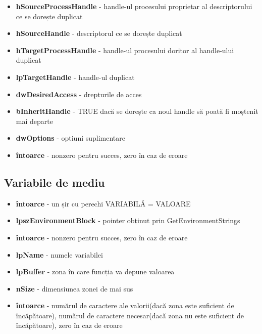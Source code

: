 \documentclass{refcard.cs.pub.ro}
\begin{document}
\begin{multicols*}{3}
\begin{itemize}
\item \textbf{hSourceProcessHandle} - handle-ul procesului proprietar al descriptorului ce se dorește duplicat
\item \textbf{hSourceHandle} - descriptorul ce se dorește duplicat
\item \textbf{hTargetProcessHandle} - handle-ul procesului doritor al handle-ului duplicat
\item \textbf{lpTargetHandle} - handle-ul duplicat
\item \textbf{dwDesiredAccess} - drepturile de acces
\item \textbf{bInheritHandle} - TRUE dacă se dorește ca noul handle să poată fi moștenit mai departe
\item \textbf{dwOptions} - optiuni suplimentare
\item \textbf{întoarce} - nonzero pentru succes, zero în caz de eroare
\end{itemize}

\vspace*{0.4cm}

\subsection{Variabile de mediu}

\begin{itemize}
\item \textbf{întoarce} - un șir cu perechi VARIABILĂ = VALOARE
\end{itemize}

\begin{itemize}
\item \textbf{lpszEnvironmentBlock} - pointer obținut prin GetEnvironmentStrings
\item \textbf{întoarce} - nonzero pentru succes, zero în caz de eroare
\end{itemize}

\begin{itemize}
\item \textbf{lpName} - numele variabilei
\item \textbf{lpBuffer} - zona în care funcția va depune valoarea
\item \textbf{nSize} - dimensiunea zonei de mai sus
\item \textbf{întoarce} - numărul de caractere ale valorii(dacă zona este suficient de încăpătoare),
 numărul de caractere necesar(dacă zona nu este suficient de încăpătoare), zero în caz de eroare
\end{itemize}


\end{multicols*}
\end{document}
